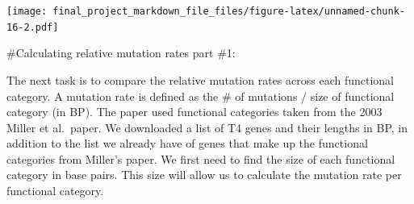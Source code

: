 \documentclass[
]{article}
\newenvironment{Shaded}{\begin{snugshade}}{\end{snugshade}}
\newcommand{\DataTypeTok}[1]{\textcolor[rgb]{0.13,0.29,0.53}{#1}}
\newcommand{\DecValTok}[1]{\textcolor[rgb]{0.00,0.00,0.81}{#1}}
\newcommand{\KeywordTok}[1]{\textcolor[rgb]{0.13,0.29,0.53}{\textbf{#1}}}
\newcommand{\NormalTok}[1]{#1}
\newcommand{\OperatorTok}[1]{\textcolor[rgb]{0.81,0.36,0.00}{\textbf{#1}}}
\newcommand{\StringTok}[1]{\textcolor[rgb]{0.31,0.60,0.02}{#1}}
\begin{document}
\begin{Shaded}
\end{Shaded}

\texttt{[image: final\_project\_markdown\_file\_files/figure-latex/unnamed-chunk-16-2.pdf]}

\#Calculating relative mutation rates part \#1:

The next task is to compare the relative mutation rates across each
functional category. A mutation rate is defined as the \# of mutations /
size of functional category (in BP). The paper used functional
categories taken from the 2003 Miller et al.~paper. We downloaded a list
of T4 genes and their lengths in BP, in addition to the list we already
have of genes that make up the functional categories from Miller's
paper. We first need to find the size of each functional category in
base pairs. This size will allow us to calculate the mutation rate per
functional category.
\end{document}
